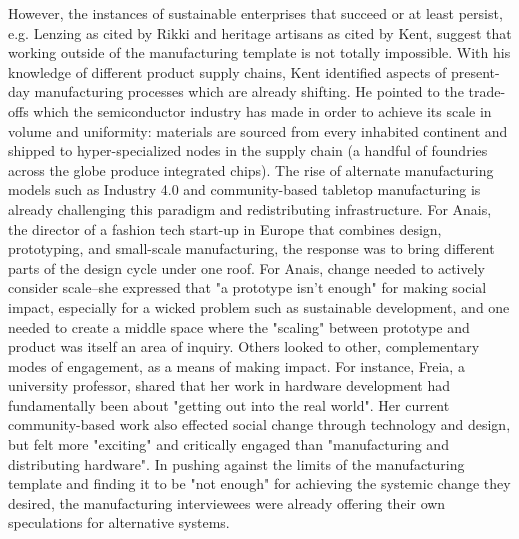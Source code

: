 However, the instances of sustainable enterprises that succeed or at least persist, e.g. Lenzing as cited by Rikki and heritage artisans as cited by Kent, suggest that working outside of the manufacturing template is not totally impossible.
With his knowledge of different product supply chains, Kent identified aspects of present-day manufacturing processes which are already shifting. He pointed to the trade-offs which the semiconductor industry has made in order to achieve its scale in volume and uniformity: materials are sourced from every inhabited continent and shipped to hyper-specialized nodes in the supply chain (a handful of foundries across the globe produce integrated chips). The rise of alternate manufacturing models such as Industry 4.0 and community-based tabletop manufacturing \cite{machado_sustainable_2020, kohtala_making_2017} is already challenging this paradigm and redistributing infrastructure. For Anais, the director of a fashion tech start-up in Europe that combines design, prototyping, and small-scale manufacturing, the response was to bring different parts of the design cycle under one roof. For Anais, change needed to actively consider scale--she expressed that "a prototype isn't enough" for making social impact, especially for a wicked problem such as sustainable development, and one needed to create a middle space where the "scaling" between prototype and product was itself an area of inquiry. Others looked to other, complementary modes of engagement, as a means of making impact. For instance, Freia, a university professor, shared that her work in hardware development had fundamentally been about "getting out into the real world". Her current community-based work also effected social change through technology and design, but felt more "exciting" and critically engaged than "manufacturing and distributing hardware". In pushing against the limits of the manufacturing template and finding it to be "not enough" for achieving the systemic change they desired, the manufacturing interviewees were already offering their own speculations for alternative systems. 
